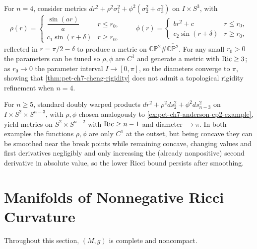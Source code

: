 \begin{example}
  \label{ex:pet-ch7-anderson-cp2-example}

  For $n=4$, consider metrics $dr^2+\rho^2\sigma_1^2+\phi^2(\sigma_2^2+\sigma_3^2)$
  on $I\times S^3$, with
  \[
    \rho(r)=\begin{cases}\dfrac{\sin(ar)}{a}&r\le r_0,\\c_1\sin(r+\delta)&r\ge
    r_0,\end{cases}\qquad
    \phi(r)=\begin{cases}br^2+c&r\le r_0,\\c_2\sin(r+\delta)&r\ge
    r_0,\end{cases}
  \]
  reflected in $r=\pi/2-\delta$ to produce a metric on $\mathbb{CP}^2\#\overline{\mathbb{CP}^2}$.
  For any small $r_0>0$ the parameters can be tuned so $\rho,\phi$ are $C^1$
  and generate a metric with $\operatorname{Ric}\ge3$; as $r_0\to0$ the parameter interval
  $I\to[0,\pi]$, so the diameters converge to $\pi$, showing that
  \cref{thm:pet-ch7-cheng-rigidity} does not admit a topological rigidity
  refinement when $n=4$.
\end{example}

\begin{example}
  \label{ex:pet-ch7-otsu-example}

  For $n\ge5$, standard doubly warped products $dr^2+\rho^2ds_2^2+\phi^2ds^2_{n-3}$
  on $I\times S^2\times S^{n-3}$, with $\rho,\phi$ chosen analogously to
  \cref{ex:pet-ch7-anderson-cp2-example}, yield metrics on $S^2\times
  S^{n-2}$ with $\operatorname{Ric}\ge n-1$ and diameter $\to\pi$. In both examples the
  functions $\rho,\phi$ are only $C^1$ at the outset, but being concave they
  can be smoothed near the break points while remaining concave, changing
  values and first derivatives negligibly and only increasing the (already
  nonpositive) second derivative in absolute value, so the lower Ricci bound
  persists after smoothing.
\end{example}

\section{Manifolds of Nonnegative Ricci Curvature}

Throughout this section, $(M,g)$ is complete and noncompact.

